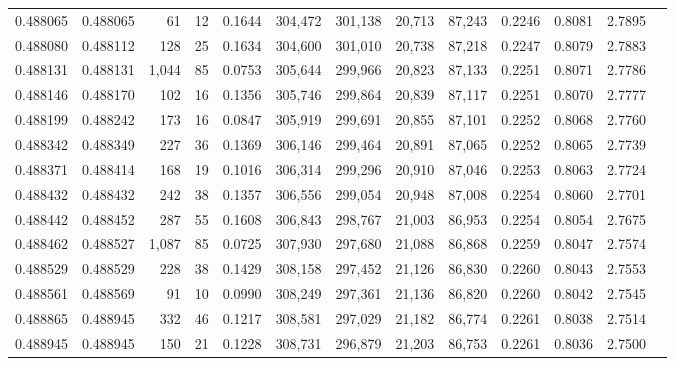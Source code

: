 \begin{tabular}{rrrrrrrrrrrrr}
0.488065 & 0.488065 &    61 &    12 &                                     0.1644 & 304,472 & 301,138 &  20,713 &  87,243 & 0.2246 & 0.8081 & 2.7895 \\
0.488080 & 0.488112 &   128 &    25 &                                     0.1634 & 304,600 & 301,010 &  20,738 &  87,218 & 0.2247 & 0.8079 & 2.7883 \\
0.488131 & 0.488131 & 1,044 &    85 &                                     0.0753 & 305,644 & 299,966 &  20,823 &  87,133 & 0.2251 & 0.8071 & 2.7786 \\
0.488146 & 0.488170 &   102 &    16 &                                     0.1356 & 305,746 & 299,864 &  20,839 &  87,117 & 0.2251 & 0.8070 & 2.7777 \\
0.488199 & 0.488242 &   173 &    16 &                                     0.0847 & 305,919 & 299,691 &  20,855 &  87,101 & 0.2252 & 0.8068 & 2.7760 \\
0.488342 & 0.488349 &   227 &    36 &                                     0.1369 & 306,146 & 299,464 &  20,891 &  87,065 & 0.2252 & 0.8065 & 2.7739 \\
0.488371 & 0.488414 &   168 &    19 &                                     0.1016 & 306,314 & 299,296 &  20,910 &  87,046 & 0.2253 & 0.8063 & 2.7724 \\
0.488432 & 0.488432 &   242 &    38 &                                     0.1357 & 306,556 & 299,054 &  20,948 &  87,008 & 0.2254 & 0.8060 & 2.7701 \\
0.488442 & 0.488452 &   287 &    55 &                                     0.1608 & 306,843 & 298,767 &  21,003 &  86,953 & 0.2254 & 0.8054 & 2.7675 \\
0.488462 & 0.488527 & 1,087 &    85 &                                     0.0725 & 307,930 & 297,680 &  21,088 &  86,868 & 0.2259 & 0.8047 & 2.7574 \\
0.488529 & 0.488529 &   228 &    38 &                                     0.1429 & 308,158 & 297,452 &  21,126 &  86,830 & 0.2260 & 0.8043 & 2.7553 \\
0.488561 & 0.488569 &    91 &    10 &                                     0.0990 & 308,249 & 297,361 &  21,136 &  86,820 & 0.2260 & 0.8042 & 2.7545 \\
0.488865 & 0.488945 &   332 &    46 &                                     0.1217 & 308,581 & 297,029 &  21,182 &  86,774 & 0.2261 & 0.8038 & 2.7514 \\
0.488945 & 0.488945 &   150 &    21 &                                     0.1228 & 308,731 & 296,879 &  21,203 &  86,753 & 0.2261 & 0.8036 & 2.7500 \\

\end{tabular}
